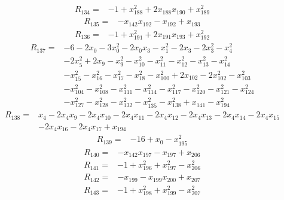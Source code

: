 \[
\begin{aligned}
R_{134}={}&-1+x_{188}^{2}+2x_{188}x_{190}+x_{189}^{2}
\end{aligned}
\]
\[
\begin{aligned}
R_{135}={}&-x_{142}x_{192}-x_{192}+x_{193}
\end{aligned}
\]
\[
\begin{aligned}
R_{136}={}&-1+x_{191}^{2}+2x_{191}x_{193}+x_{192}^{2}
\end{aligned}
\]
\[
\begin{aligned}
R_{137}={}&-6-2x_{0}-3x_{0}^{2}-2x_{0}x_{3}-x_{1}^{2}-2x_{3}-2x_{3}^{2}-x_{4}^{2}\\
&-2x_{5}^{2}+2x_{9}-x_{9}^{2}-x_{10}^{2}-x_{11}^{2}-x_{12}^{2}-x_{13}^{2}-x_{14}^{2}\\
&-x_{15}^{2}-x_{16}^{2}-x_{17}^{2}-x_{18}^{2}-x_{100}^{2}+2x_{102}-2x_{102}^{2}-x_{103}^{2}\\
&-x_{104}^{2}-x_{108}^{2}-x_{111}^{2}-x_{114}^{2}-x_{117}^{2}-x_{120}^{2}-x_{121}^{2}-x_{124}^{2}\\
&-x_{127}^{2}-x_{128}^{2}-x_{132}^{2}-x_{135}^{2}-x_{138}^{2}+x_{141}-x_{194}^{2}
\end{aligned}
\]
\[
\begin{aligned}
R_{138}={}&x_{4}-2x_{4}x_{9}-2x_{4}x_{10}-2x_{4}x_{11}-2x_{4}x_{12}-2x_{4}x_{13}-2x_{4}x_{14}-2x_{4}x_{15}\\
&-2x_{4}x_{16}-2x_{4}x_{17}+x_{194}
\end{aligned}
\]
\[
\begin{aligned}
R_{139}={}&-16+x_{0}-x_{195}^{2}
\end{aligned}
\]
\[
\begin{aligned}
R_{140}={}&-x_{142}x_{197}-x_{197}+x_{206}
\end{aligned}
\]
\[
\begin{aligned}
R_{141}={}&-1+x_{196}^{2}+x_{197}^{2}-x_{206}^{2}
\end{aligned}
\]
\[
\begin{aligned}
R_{142}={}&-x_{199}-x_{199}x_{200}+x_{207}
\end{aligned}
\]
\[
\begin{aligned}
R_{143}={}&-1+x_{198}^{2}+x_{199}^{2}-x_{207}^{2}
\end{aligned}
\]
